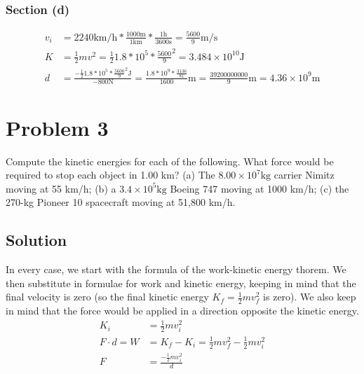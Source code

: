 \documentclass[12pt]{article}
\begin{document}
\subsubsection*{Section (d)}
\begin{align*}
    v_i &= 2240 \unit{\kilo\meter/\hour} * \frac{1000 \unit{\meter}}{1 \unit{\kilo\meter}} * \frac{1 \unit{\hour}}{3600 \unit{\second}} = \frac{5600}{9} \unit{\meter/\second}\\
    K   &= \frac{1}{2}mv^2 = \frac{1}{2} 1.8*10^5 * \frac{5600}{9}^2 = \boxed{3.484 \times 10^{10} \unit{\joule}}\\
    d   &= \frac{-\frac{1}{2}1.8*10^5*\frac{5600}{9}^2 \unit{\joule}}{-800 \unit{\newton}}
        = \frac{1.8*10^9*\frac{3136}{81}}{1600} \unit{\meter} 
        = \boxed{\frac{39200000000}{9} \unit{\meter} = 4.36 \times 10^9 \unit{\meter}}
\end{align*}

\pagebreak
\section*{Problem 3}
Compute the kinetic energies for each of the following. What force would be required to stop each object in 1.00 km? (a) The $8.00 \times 10^7 \unit{\kilo\gram}$ carrier Nimitz moving at 55 km/h; (b) a $3.4 \times 10^5 \unit{\kilo\gram}$ Boeing 747 moving at 1000 km/h; (c) the 270-kg Pioneer 10 spacecraft moving at 51,800 km/h.

\subsection*{Solution}
In every case, we start with the formula of the work-kinetic energy thorem. We then substitute in formulae for work and kinetic energy, keeping in mind that the final velocity is zero (so the final kinetic energy $K_f = \frac{1}{2}mv_f^2$ is zero). We also keep in mind that the force would be applied in a direction opposite the kinetic energy.
\begin{align*}
    K_i &= \frac{1}{2}mv_i^2\\
    F \cdot d = W   &= K_f - K_i = \frac{1}{2}mv_f^2 - \frac{1}{2}mv_i^2\\
    F   &= \frac{-\frac{1}{2}mv_i^2}{d}
\end{align*}
\end{document}
